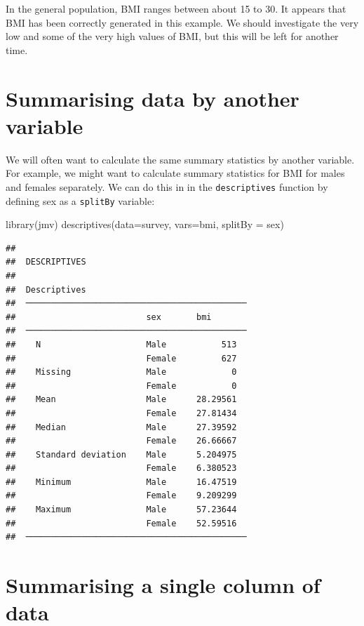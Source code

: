 \documentclass[
]{memoir}
\newenvironment{Shaded}{\begin{snugshade}}{\end{snugshade}}
\newcommand{\AttributeTok}[1]{\textcolor[rgb]{0.77,0.63,0.00}{#1}}
\newcommand{\FunctionTok}[1]{\textcolor[rgb]{0.00,0.00,0.00}{#1}}
\newcommand{\NormalTok}[1]{#1}
\begin{document}
In the general population, BMI ranges between about 15 to 30. It appears that BMI has been correctly generated in this example. We should investigate the very low and some of the very high values of BMI, but this will be left for another time.

\hypertarget{summarising-data-by-another-variable}{%
\section{Summarising data by another variable}\label{summarising-data-by-another-variable}}

We will often want to calculate the same summary statistics by another variable. For example, we might want to calculate summary statistics for BMI for males and females separately. We can do this in in the \texttt{descriptives} function by defining sex as a \texttt{splitBy} variable:

\begin{Shaded}
\begin{Highlighting}[]
\FunctionTok{library}\NormalTok{(jmv)}
\FunctionTok{descriptives}\NormalTok{(}\AttributeTok{data=}\NormalTok{survey, }\AttributeTok{vars=}\NormalTok{bmi, }\AttributeTok{splitBy =}\NormalTok{ sex)}
\end{Highlighting}
\end{Shaded}

\begin{verbatim}
## 
##  DESCRIPTIVES
## 
##  Descriptives                                 
##  ──────────────────────────────────────────── 
##                          sex       bmi        
##  ──────────────────────────────────────────── 
##    N                     Male           513   
##                          Female         627   
##    Missing               Male             0   
##                          Female           0   
##    Mean                  Male      28.29561   
##                          Female    27.81434   
##    Median                Male      27.39592   
##                          Female    26.66667   
##    Standard deviation    Male      5.204975   
##                          Female    6.380523   
##    Minimum               Male      16.47519   
##                          Female    9.209299   
##    Maximum               Male      57.23644   
##                          Female    52.59516   
##  ────────────────────────────────────────────
\end{verbatim}

\hypertarget{summarising-a-single-column-of-data}{%
\section{Summarising a single column of data}\label{summarising-a-single-column-of-data}}
\end{document}

